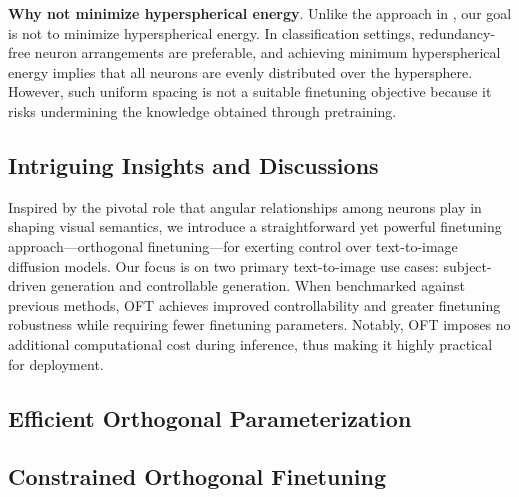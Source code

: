 \textbf{Why not minimize hyperspherical energy}. Unlike the approach in \cite{liu2021orthogonal}, our goal is not to minimize hyperspherical energy. In classification settings, redundancy-free neuron arrangements are preferable, and achieving minimum hyperspherical energy implies that all neurons are evenly distributed over the hypersphere. However, such uniform spacing is not a suitable finetuning objective because it risks undermining the knowledge obtained through pretraining.

\begin{itemize}[leftmargin=*,nosep]

\section{Intriguing Insights and Discussions}

Inspired by the pivotal role that angular relationships among neurons play in shaping visual semantics, we introduce a straightforward yet powerful finetuning approach—orthogonal finetuning—for exerting control over text-to-image diffusion models. Our focus is on two primary text-to-image use cases: subject-driven generation and controllable generation. When benchmarked against previous methods, OFT achieves improved controllability and greater finetuning robustness while requiring fewer finetuning parameters. Notably, OFT imposes no additional computational cost during inference, thus making it highly practical for deployment.

\subsection{Efficient Orthogonal Parameterization}\label{sect:eff_ortho}

\subsection{Constrained Orthogonal Finetuning}


\end{itemize}
